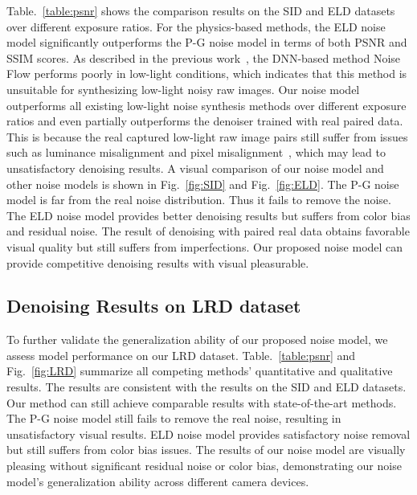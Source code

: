 \documentclass[10pt,twocolumn,letterpaper]{article}
\begin{document}
Table.~\ref{table:psnr} shows the comparison results on the SID and ELD datasets over different exposure ratios. For the physics-based methods, the ELD noise model significantly outperforms the P-G noise model in terms of both PSNR and SSIM scores. As described in the previous work~\cite{zhang2021rethinking}, the DNN-based method Noise Flow performs poorly in low-light conditions, which indicates that this method is unsuitable for synthesizing low-light noisy raw images. Our noise model outperforms all existing low-light noise synthesis methods over different exposure ratios and even partially outperforms the denoiser trained with real paired data. This is because the real captured low-light raw image pairs still suffer from issues such as luminance misalignment and pixel misalignment~\cite{lehtinen2018noise2noise}, which may lead to unsatisfactory denoising results. A visual comparison of our noise model and other noise models is shown in Fig.~\ref{fig:SID} and Fig.~\ref{fig:ELD}. The P-G noise model is far from the real noise distribution. Thus it fails to remove the noise. The ELD noise model provides better denoising results but suffers from color bias and residual noise. The result of denoising with paired real data obtains favorable visual quality but still suffers from imperfections. Our proposed noise model can provide competitive denoising results with visual pleasurable.

\vspace{-0.5em}
\subsection{Denoising Results on LRD dataset}
\vspace{-0.5em}
To further validate the generalization ability of our proposed noise model, we assess model performance on our LRD dataset. Table.~\ref{table:psnr} and Fig.~\ref{fig:LRD} summarize all competing methods' quantitative and qualitative results. The results are consistent with the results on the SID and ELD datasets. Our method can still achieve comparable results with state-of-the-art methods. The P-G noise model still fails to remove the real noise, resulting in unsatisfactory visual results. ELD noise model provides satisfactory noise removal but still suffers from color bias issues. The results of our noise model are visually pleasing without significant residual noise or color bias, demonstrating our noise model's generalization ability across different camera devices.
\end{document}
